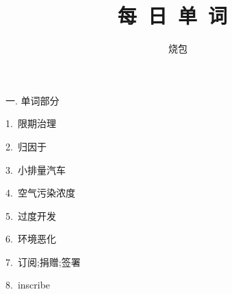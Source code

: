 \documentclass[a4paper, 12pt]{article}
\begin{document}
    \noindent

    \title{ 每\ 日\ 单\ 词\  }
    \author{ 烧包 }
    \maketitle

\begin{flushleft}
一. 单词部分
\end{flushleft}

\begin{multicols}{2}
\begin{flushleft}
1.\ 限期治理 \ \ \ \ \underline{\hspace{3cm}}
\end{flushleft}

\begin{flushleft}
2.\ 归因于 \ \ \ \ \underline{\hspace{3cm}}
\end{flushleft}
\end{multicols}

\begin{multicols}{2}
\begin{flushleft}
3.\ 小排量汽车 \ \ \ \ \underline{\hspace{3cm}}
\end{flushleft}

\begin{flushleft}
4.\ 空气污染浓度 \ \ \ \ \underline{\hspace{3cm}}
\end{flushleft}
\end{multicols}

\begin{multicols}{2}
\begin{flushleft}
5.\ 过度开发 \ \ \ \ \underline{\hspace{3cm}}
\end{flushleft}

\begin{flushleft}
6.\ 环境恶化 \ \ \ \ \underline{\hspace{3cm}}
\end{flushleft}
\end{multicols}

\begin{multicols}{2}
\begin{flushleft}
7.\ 订阅;捐赠;签署 \ \ \ \ \underline{\hspace{3cm}}
\end{flushleft}

\begin{flushleft}
8.\ inscribe \ \ \ \ \underline{\hspace{3cm}}
\end{flushleft}
\end{multicols}
\end{document}
